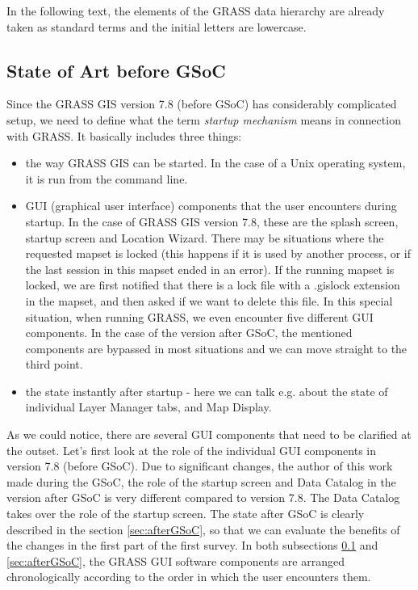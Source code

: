 \documentclass[a4paper,10pt,twoside]{article}
\begin{document}
In the following text, the elements of the GRASS data hierarchy are
already taken as standard terms and the initial letters are lowercase.

\newpage
\vspace*{-1cm}
\subsection{State of Art before GSoC}
\label{sec:beforeGSoC}

\noindent Since the GRASS GIS version 7.8 (before GSoC) has
considerably complicated setup, we need to define what the term
\textit{startup mechanism} means in connection with GRASS. It
basically includes three things:

\begin {itemize}

\item the way GRASS GIS can be started. In the case of a Unix
  operating system, it is run from the command line.

\item GUI (graphical user interface) components that the user
  encounters during startup. In the case of GRASS GIS version 7.8,
  these are the splash screen, startup screen and Location
  Wizard. There may be situations where the requested mapset is locked
  (this happens if it is used by another process, or if the last
  session in this mapset ended in an error). If the running mapset is
  locked, we are first notified that there is a lock file with a
  .gislock extension in the mapset, and then asked if we want to
  delete this file. In this special situation, when running GRASS, we
  even encounter five different GUI components.  In the case of the
  version after GSoC, the mentioned components are bypassed in most
  situations and we can move straight to the third point.

\item the state instantly after startup - here we can talk e.g. about
  the state of individual Layer Manager tabs, and Map Display.

\end{itemize}

\noindent As we could notice, there are several GUI components that
need to be clarified at the outset. Let's first look at the role of
the individual GUI components in version 7.8 (before GSoC). Due to
significant changes, the author of this work made during the GSoC, the
role of the startup screen and Data Catalog in the version after GSoC
is very different compared to version 7.8. The Data Catalog takes over
the role of the startup screen. The state after GSoC is clearly
described in the section \ref{sec:afterGSoC}, so that we can evaluate
the benefits of the changes in the first part of the first survey. In
both subsections \ref{sec:beforeGSoC} and \ref{sec:afterGSoC}, the
GRASS GUI software components are arranged chronologically according
to the order in which the user encounters them.
\end{document}
